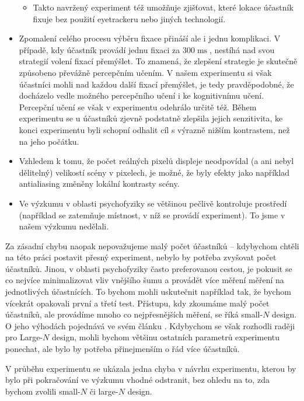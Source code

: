 \begin{itemize}
\begin{itemize}
\item Takto navržený experiment též umožňuje zjišťovat, které lokace účastník
fixuje bez použití eyetrackeru nebo jiných technologií.

\end{itemize}

\item Zpomalení celého procesu výběru fixace přináší ale i jednu komplikaci. V případě, kdy
účastník provádí jednu fixaci za $300\operatorname{ms}$, nestíhá nad svou
strategií volení fixací přemýšlet. To znamená, že zlepšení strategie je
skutečně způsobeno převážně percepčním učením. V našem experimentu si však
účastníci mohli nad každou další fixací přemýšlet, je tedy pravděpodobné, že
docházelo vedle možného percepčního učení  i ke kognitivnímu učení. Percepční
učení se však v experimentu odehrálo určitě též.  Během experimentu se u
účastníků zjevně podstatně zlepšila jejich senzitivita, ke konci experimentu
byli schopní odhalit cíl s výrazně nižším kontrastem, než na jeho počátku.


\item Vzhledem k tomu, že počet reálných pixelů displeje neodpovídal (a ani
nebyl dělitelný) velikostí scény v pixelech, je možné, že byly efekty jako
například antialiasing změněny lokální kontrasty scény.

\item Ve výzkumu v oblasti psychofyziky se většinou
pečlivě kontroluje prostředí (například se zatemňuje místnost, v níž se provádí experiment). To jsme v našem výzkumu nedělali.

\end{itemize}

Za zásadní chybu naopak
nepovažujeme malý počet účastníků -- kdybychom chtěli na této práci postavit
přesný experiment, nebylo by potřeba zvyšovat počet účastníků. Jinou, v oblasti
psychofyziky často preferovanou cestou, je pokusit se co nejvíce minimalizovat vliv vnějšího šumu a provádět více měření
měření na jednotlivých účastnících. To bychom mohli uskutečnit například tak, že bychom vícekrát opakovali
první a třetí test. Přístupu, kdy zkoumáme malý počet účastníků, ale provádíme mnoho co nejpřesnějších měření, se říká small-$N$ design. O jeho výhodách pojednává ve svém článku \citet{SmallN}. Kdybychom se však rozhodli raději pro Large-$N$ design, mohli
bychom většinu ostatních parametrů experimentu ponechat, ale bylo by potřeba
přinejmenším o řád více účastníků.

V průběhu experimentu se ukázala jedna chyba v návrhu experimentu, kterou by
bylo při pokračování ve výzkumu vhodné odstranit, bez ohledu na to, zda bychom
zvolili small-$N$ či large-$N$ design. 

